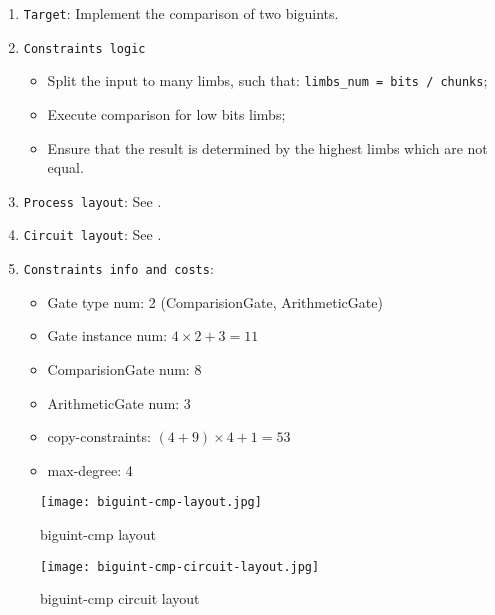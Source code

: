 
\begin{enumerate}
    \item \verb|Target|: Implement the comparison of two biguints.
    \item \verb|Constraints logic|
    \begin{itemize}
        \item Split the input to many limbs, such that: \verb|limbs_num = bits / chunks|;
        \item Execute comparison for low bits limbs;
        \item Ensure that the result is determined by the highest limbs which are not equal.
    \end{itemize}
    \item \verb|Process layout|: See .
    \item \verb|Circuit layout|: See .
    \item \verb|Constraints info and costs|:
    \begin{itemize}
        \item Gate type num: 2 (ComparisionGate, ArithmeticGate)
        \item Gate instance num: $4 \times 2 + 3 = 11$
        \item ComparisionGate num: 8
        \item ArithmeticGate num: 3
        \item copy-constraints: $(4 + 9) \times 4 + 1 = 53$
        \item max-degree: 4
    \end{itemize}
\end{enumerate}

\begin{figure}[!ht]
    \centering
    \texttt{[image: biguint-cmp-layout.jpg]}
    \caption{biguint-cmp layout}
    \label{fig:biguint-cmp-layout}
\end{figure}

\begin{figure}[!ht]
    \centering
    \texttt{[image: biguint-cmp-circuit-layout.jpg]}
    \caption{biguint-cmp circuit layout}
    \label{fig:biguint-cmp-circuit-layout}
\end{figure}
